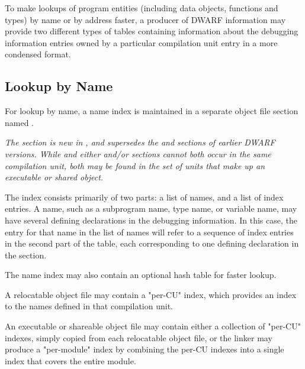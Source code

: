 To make lookups of program entities (including data objects, 
functions and types) by name or by address faster, a producer 
of DWARF information may provide two different types of tables
containing information about the debugging information
entries owned by a particular compilation unit entry in a
more condensed format.

\subsection{Lookup by Name}
For lookup by name, a name index is maintained in a separate
object file section named \dotdebugnames{}. 

\textit{The \dotdebugnames{} section is new in \DWARFVersionV,
and supersedes the \dotdebugpubnames{} and \dotdebugpubtypes{}
sections of earlier DWARF versions. While \dotdebugnames{} and
either \dotdebugpubnames{} and/or \dotdebugpubtypes{} sections
cannot both occur in the same compilation unit, both may be
found in the set of units that make up an executable or shared
object.}

The index consists
primarily of two parts: a list of names, and a list of index
entries. A name, such as a subprogram name, type name, or
variable name, may have several defining declarations in the
debugging information. In this case, the entry for that name in
the list of names will refer to a sequence of index entries in
the second part of the table, each corresponding to one defining
declaration in the \dotdebuginfo{} section.

The name index may also contain an optional hash table for faster
lookup.

A relocatable object file may contain a "per-CU" index, which
provides an index to the names defined in that compilation
unit.

An executable or shareable object file may contain either a collection of
"per-CU" indexes, simply copied from each relocatable object
file, or the linker may produce a "per-module" index by
combining the per-CU indexes into a single index that covers
the entire 
\db
module.

